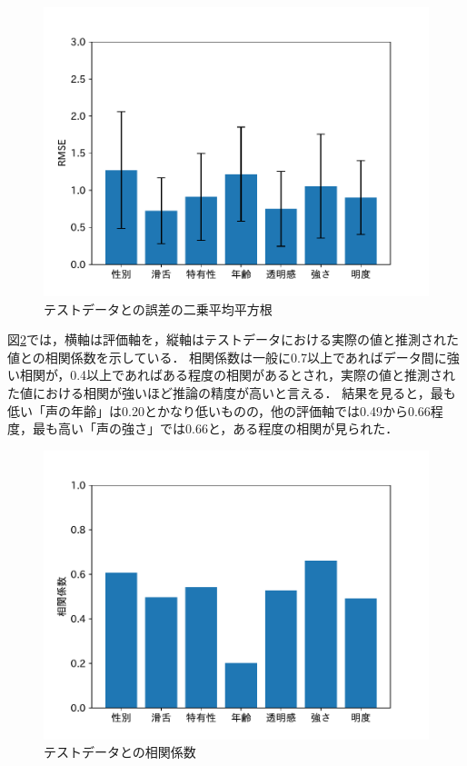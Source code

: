 \begin{figure}[htb]
  \centering
  \includegraphics[width=\linewidth]{fig/rmse.pdf}
  \caption{テストデータとの誤差の二乗平均平方根}
  \label{tab:score_box}
\end{figure}

図\ref{tab:score_coor}では，横軸は評価軸を，縦軸はテストデータにおける実際の値と推測された値との相関係数を示している．
相関係数は一般に0.7以上であればデータ間に強い相関が，0.4以上であればある程度の相関があるとされ，実際の値と推測された値における相関が強いほど推論の精度が高いと言える．
結果を見ると，最も低い「声の年齢」は0.20とかなり低いものの，他の評価軸では0.49から0.66程度，最も高い「声の強さ」では0.66と，ある程度の相関が見られた．

\begin{figure}[htb]
  \centering
  \includegraphics[width=\linewidth]{fig/coorpdf.pdf}
  \caption{テストデータとの相関係数}
  \label{tab:score_coor}
\end{figure}

